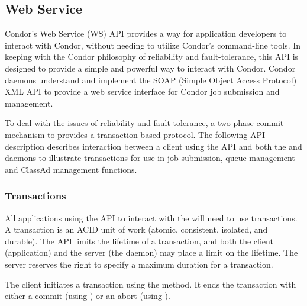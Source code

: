 \subsection{\label{API-WebService} Web Service}

Condor's Web Service (WS) API provides a way for application developers
to interact with Condor, without needing to utilize
Condor's command-line tools.
In keeping with the Condor philosophy of reliability and fault-tolerance,
this API is designed to provide a simple and powerful way
to interact with Condor.
Condor daemons understand and implement
the SOAP (Simple Object Access Protocol) XML API
to provide a web service interface for Condor job submission
and management.

To deal with the issues of reliability and fault-tolerance,
a two-phase commit mechanism to provides a transaction-based protocol.  
The following API description describes interaction
between a client using the API and both the  and 
 daemons to illustrate transactions
for use in job submission, queue management and ClassAd 
management functions.

\subsubsection{\label{WebService-Transactions} Transactions}

All applications using the API to interact with the 
will need to use transactions.
A transaction is
an ACID unit of work (atomic, consistent, isolated, and durable).
The API limits the lifetime of a transaction,
and both the client (application) and the server
(the  daemon)
may place a limit on the lifetime.
The server reserves the right to specify a maximum
duration for a transaction. 


The client initiates a transaction using the
 method. 
It ends the transaction with either 
a commit (using )
or an abort (using ).

